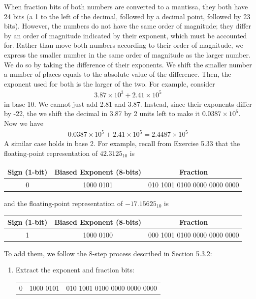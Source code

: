 \documentclass[12pt]{article}
\newenvironment{sol}[1][Solution]{\begin{trivlist}
		\item[\hskip \labelsep {\bfseries #1:}]}{\end{trivlist}}
\begin{document}
\begin{sol}
	When fraction bits of both numbers are converted to a mantissa, they both have
	24 bits (a 1 to the left of the decimal, followed by a decimal point, followed
	by 23 bits). However, the numbers do not have the same order of magnitude; they
	differ by an order of magnitude indicated by their exponent, which must be
	accounted for. Rather than move both numbers according to their order of magnitude,
	we express the smaller number in the same order of magnitude as the larger number.
	We do so by taking the difference of their exponents. We shift the smaller number
	a number of places equals to the absolute value of the difference. Then, the exponent
	used for both is the larger of the two. For example, consider
	\begin{align*}
		3.87\times 10^{3}+2.41\times 10^{5}
	\end{align*}
	in base 10. We cannot just add 2.81 and 3.87. Instead, since their exponents differ
	by -22, the we shift the decimal in 3.87 by 2 units left to make it $0.0387\times 10^{5}$.
	Now we have
	\begin{align*}
		0.0387\times 10^{5}+2.41\times 10^{5}=2.4487\times 10^5
	\end{align*}
	A similar case holds in base 2. For example, recall from Exercise 5.33 that the
	floating-point representation of $42.3125_{10}$ is
	\begin{center}
		\begin{tabular}{c|c|c}
			Sign (1-bit) & Biased Exponent (8-bits) & Fraction\\
			\hline
			0 & 1000 0101 & 010 1001 0100 0000 0000 0000
		\end{tabular}
	\end{center}
	and the floating-point representation of $-17.15625_{10}$ is
	\begin{center}
		\begin{tabular}{c|c|c}
			Sign (1-bit) & Biased Exponent (8-bits) & Fraction\\
			\hline
			1 & 1000 0100 & 000 1001 0100 0000 0000 0000
		\end{tabular}
	\end{center}
	To add them, we follow the 8-step process described in Section 5.3.2:
	\begin{enumerate}
		\item Extract the exponent and fraction bits:
		\begin{center}
			\begin{tabular}{|c|c|c|}
				\hline
				0 & 1000 0101 & 010 1001 0100 0000 0000 0000\\

\end{tabular}
\end{center}
\end{enumerate}
\end{sol}
\end{document}
